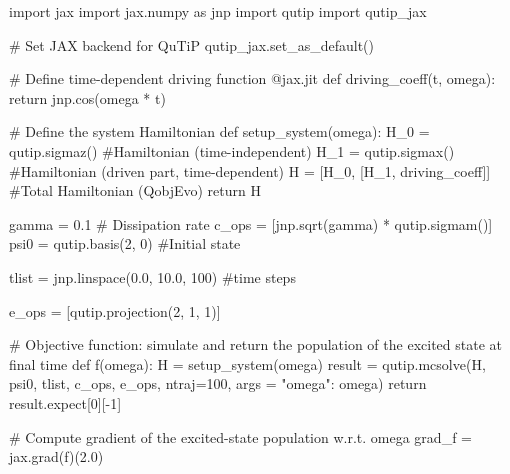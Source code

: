 import jax
import jax.numpy as jnp
import qutip
import qutip_jax

# Set JAX backend for QuTiP
qutip_jax.set_as_default()

# Define time-dependent driving function
@jax.jit
def driving_coeff(t, omega):
    return jnp.cos(omega * t)

# Define the system Hamiltonian
def setup_system(omega):
    H_0 = qutip.sigmaz() #Hamiltonian (time-independent)
    H_1 = qutip.sigmax()  #Hamiltonian (driven part, time-dependent)
    H = [H_0, [H_1, driving_coeff]]  #Total Hamiltonian (QobjEvo)
    return H

gamma = 0.1  # Dissipation rate
c_ops = [jnp.sqrt(gamma) * qutip.sigmam()]
psi0 = qutip.basis(2, 0) #Initial state

tlist = jnp.linspace(0.0, 10.0, 100) #time steps

e_ops = [qutip.projection(2, 1, 1)]

# Objective function: simulate and return the population of the excited state at final time
def f(omega):
    H = setup_system(omega)
    result = qutip.mcsolve(H, psi0, tlist, c_ops, e_ops, ntraj=100, args = {"omega": omega})
    return result.expect[0][-1]  

# Compute gradient of the excited-state population w.r.t. omega
grad_f = jax.grad(f)(2.0)
